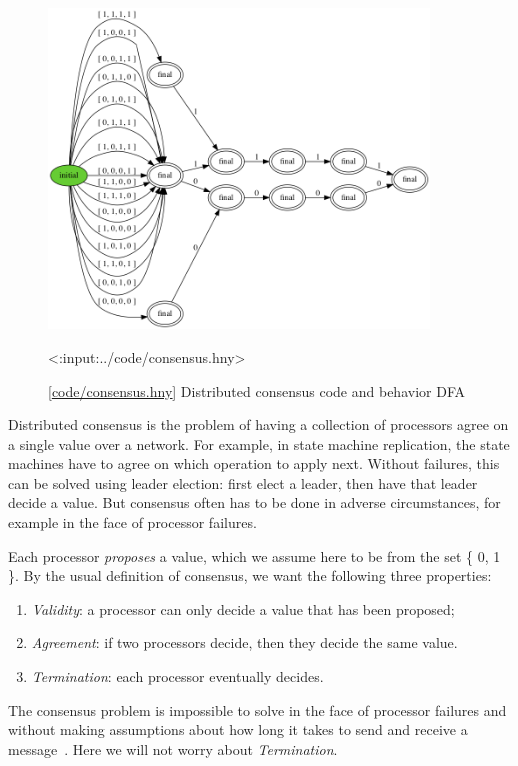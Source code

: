 \documentclass{report}
\newcommand{\harmonylink}[1]{%
[\href{https://harmony.cs.cornell.edu/#1}{\underline{#1}}]%
}
\newenvironment{code}{
\tcolorbox
}{
\endtcolorbox
}
\begin{document}
\begin{figure}
\begin{center}
\includegraphics[width=0.9\textwidth]{figures/consensus.png}
\end{center}
\begin{code}
<{:input:../code/consensus.hny}>
\end{code}
\caption{\harmonylink{code/consensus.hny} Distributed consensus code and behavior DFA}
\label{fig:consensus}
\end{figure}

Distributed consensus is the problem of having a collection of processors agree
on a single value over a network.
For example, in state machine replication, the state machines have to agree
on which operation to apply next.
Without failures, this can be solved using leader election: first elect a leader, then have that leader decide a value.
But consensus often has to be done in adverse circumstances,
for example in the face of processor failures.

Each processor \emph{proposes} a value, which we assume here to be from the
set \{ 0, 1 \}.
By the usual definition of consensus, we want the following three properties:
\begin{enumerate}
\item \emph{Validity}: a processor can only decide a value that has been proposed;
\item \emph{Agreement}: if two processors decide, then they decide the same value.
\item \emph{Termination}: each processor eventually decides.
\end{enumerate}
The consensus problem is impossible to solve in the face of processor
failures and without making assumptions about how long it takes to send
and receive a message~\cite{FLP85}.
Here we will not worry about \emph{Termination}.
\end{document}
